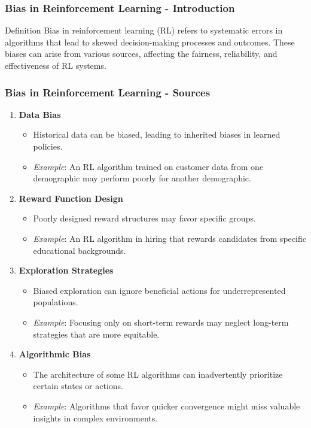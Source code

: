 \documentclass{beamer}
\begin{document}
\begin{frame}[fragile]
    \frametitle{Bias in Reinforcement Learning - Introduction}
    \begin{block}{Definition}
        Bias in reinforcement learning (RL) refers to systematic errors in algorithms that lead to skewed decision-making processes and outcomes. These biases can arise from various sources, affecting the fairness, reliability, and effectiveness of RL systems.
    \end{block}
\end{frame}

\begin{frame}[fragile]
    \frametitle{Bias in Reinforcement Learning - Sources}
    \begin{enumerate}
        \item \textbf{Data Bias}
            \begin{itemize}
                \item Historical data can be biased, leading to inherited biases in learned policies.
                \item \emph{Example}: An RL algorithm trained on customer data from one demographic may perform poorly for another demographic.
            \end{itemize}
        \item \textbf{Reward Function Design}
            \begin{itemize}
                \item Poorly designed reward structures may favor specific groups.
                \item \emph{Example}: An RL algorithm in hiring that rewards candidates from specific educational backgrounds.
            \end{itemize}
        \item \textbf{Exploration Strategies}
            \begin{itemize}
                \item Biased exploration can ignore beneficial actions for underrepresented populations.
                \item \emph{Example}: Focusing only on short-term rewards may neglect long-term strategies that are more equitable.
            \end{itemize}
        \item \textbf{Algorithmic Bias}
            \begin{itemize}
                \item The architecture of some RL algorithms can inadvertently prioritize certain states or actions.
                \item \emph{Example}: Algorithms that favor quicker convergence might miss valuable insights in complex environments.
            \end{itemize}
    \end{enumerate}
\end{frame}
\end{document}
